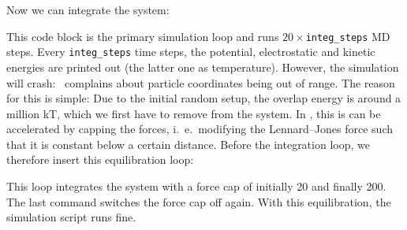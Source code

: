 Now we can integrate the system:
This code block is the primary simulation loop and runs
$20\times$\verb|integ_steps| MD steps. Every \verb|integ_steps| time steps, the
potential, electrostatic and kinetic energies are printed out (the latter one as
temperature). However, the simulation will crash: \es\ complains about particle
coordinates being out of range. The reason for this is simple: Due to the
initial random setup, the overlap energy is around a million kT, which we first
have to remove from the system. In \es, this is can be accelerated by capping
the forces, i.~e.\ modifying the Lennard--Jones force such that it is constant
below a certain distance. Before the integration loop, we therefore insert this
equilibration loop:
This loop integrates the system with a force cap of initially 20 and finally
200.  The last command switches the force cap off again. With this
equilibration, the simulation script runs fine.


